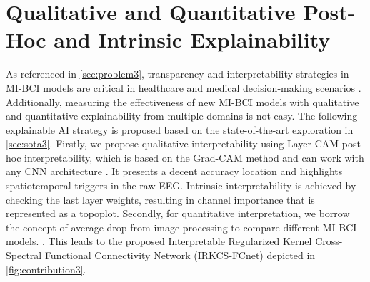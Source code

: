\section{Qualitative and Quantitative Post-Hoc and Intrinsic Explainability}

As referenced in \cref{sec:problem3}, transparency and interpretability strategies in MI-BCI models are critical in healthcare and medical decision-making scenarios \cite{miotto2018deep, xiao2018opportunities}. Additionally, measuring the effectiveness of new MI-BCI models with qualitative and quantitative explainability from multiple domains is not easy. The following explainable AI strategy is proposed based on the state-of-the-art exploration in \cref{sec:sota3}. Firstly, we propose qualitative interpretability using Layer-CAM post-hoc interpretability, which is based on the Grad-CAM method and can work with any CNN architecture \cite{chaddad2023survey}. It presents a decent accuracy location \cite{nunnari2021overlap} and highlights spatiotemporal triggers in the raw EEG. Intrinsic interpretability is achieved by checking the last layer weights, resulting in channel importance that is represented as a topoplot. Secondly, for quantitative interpretation, we borrow the concept of average drop \cite{naidu2020cam} from image processing to compare different MI-BCI models. . This leads to the proposed Interpretable Regularized Kernel Cross-Spectral Functional Connectivity Network (IRKCS-FCnet) depicted in \cref{fig:contribution3}.

